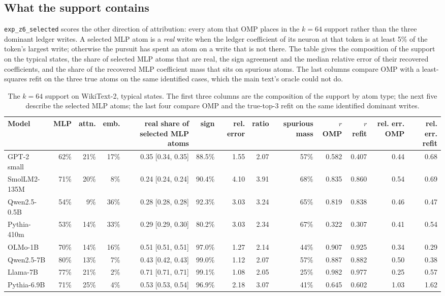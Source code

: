 \subsection{What the support contains}\label{app:z6}
\texttt{exp\_z6\_selected} scores the other direction of attribution: every atom that OMP places in the $k=64$ support rather than the three dominant ledger writes. A selected MLP atom is a \emph{real} write when the ledger coefficient of its neuron at that token is at least 5\% of the token's largest write; otherwise the pursuit has spent an atom on a write that is not there. The table gives the composition of the support on the typical states, the share of selected MLP atoms that are real, the sign agreement and the median relative error of their recovered coefficients, and the share of the recovered MLP coefficient mass that sits on spurious atoms. The last columns compare OMP with a least-squares refit on the three true atoms on the same identified cases, which the main text's oracle could not do.
\begin{table}[H]\centering\scriptsize
\caption{The $k=64$ support on WikiText-2, typical states. The first three columns are the composition of the support by atom type; the next five describe the selected MLP atoms; the last four compare OMP and the true-top-3 refit on the same identified dominant writes.}\label{app:z6-wikitext}
\begin{adjustbox}{max width=\linewidth}
\begin{tabular}{lrrrrrrrrrrrr}\toprule
Model & MLP & attn. & emb. & real share of selected MLP atoms & sign & rel. error & ratio & spurious mass & $r$ OMP & $r$ refit & rel. err. OMP & rel. err. refit \\ \midrule
GPT-2 small & 62\% & 21\% & 17\% & 0.35 [0.34, 0.35] & 88.5\% & 1.55 & 2.07 & 57\% & 0.582 & 0.407 & 0.44 & 0.68 \\
SmolLM2-135M & 71\% & 20\% & 8\% & 0.24 [0.24, 0.24] & 90.4\% & 4.10 & 3.91 & 68\% & 0.835 & 0.860 & 0.54 & 0.69 \\
Qwen2.5-0.5B & 54\% & 9\% & 36\% & 0.28 [0.28, 0.28] & 92.3\% & 3.03 & 3.24 & 65\% & 0.819 & 0.838 & 0.46 & 0.47 \\
Pythia-410m & 53\% & 14\% & 33\% & 0.29 [0.29, 0.30] & 80.2\% & 3.03 & 2.34 & 67\% & 0.322 & 0.307 & 0.41 & 0.54 \\
OLMo-1B & 70\% & 14\% & 16\% & 0.51 [0.51, 0.51] & 97.0\% & 1.27 & 2.14 & 44\% & 0.907 & 0.925 & 0.34 & 0.29 \\
Qwen2.5-7B & 80\% & 13\% & 7\% & 0.43 [0.42, 0.43] & 99.0\% & 1.12 & 2.07 & 57\% & 0.887 & 0.882 & 0.50 & 0.38 \\
Llama-7B & 77\% & 21\% & 2\% & 0.71 [0.71, 0.71] & 99.1\% & 1.08 & 2.05 & 25\% & 0.982 & 0.977 & 0.25 & 0.57 \\
Pythia-6.9B & 71\% & 25\% & 4\% & 0.53 [0.53, 0.54] & 96.9\% & 2.18 & 3.07 & 41\% & 0.645 & 0.602 & 1.03 & 1.62 \\
\bottomrule\end{tabular}\end{adjustbox}
\end{table}
